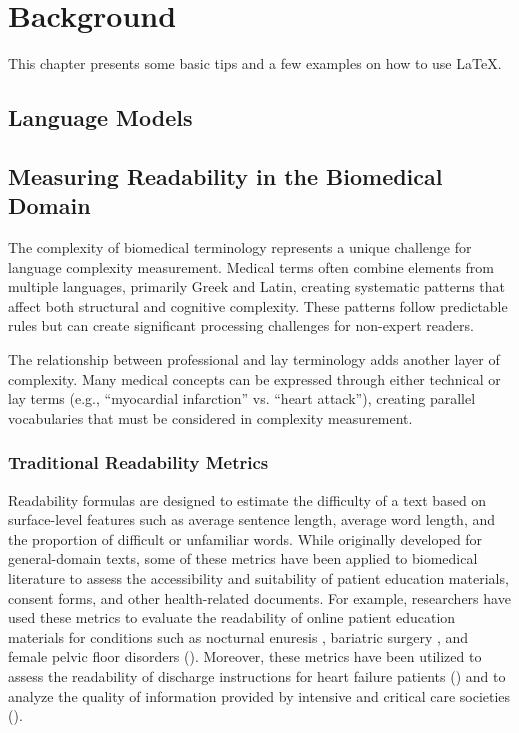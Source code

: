 \chapter{Background}
\label{c2}

This chapter presents some basic tips and a few examples on how to use \LaTeX.


\section{Language Models}
\label{c2:s:language-models}

\section{Measuring Readability in the Biomedical Domain}
\label{c2:s:linguistic-complexity}

The complexity of biomedical terminology represents a unique challenge for language complexity measurement. 
Medical terms often combine elements from multiple languages, primarily Greek and Latin, creating systematic patterns that affect both structural and cognitive complexity. 
These patterns follow predictable rules but can create significant processing challenges for non-expert readers.

The relationship between professional and lay terminology adds another layer of complexity. 
Many medical concepts can be expressed through either technical or lay terms (e.g., ``myocardial infarction'' vs. ``heart attack''), creating parallel vocabularies that must be considered in complexity measurement. 

\subsection{Traditional Readability Metrics}

Readability formulas are designed to estimate the difficulty of a text based on surface-level features such as average sentence length, average word length, and the proportion of difficult or unfamiliar words. While originally developed for general-domain texts, some of these metrics have been applied to biomedical literature to assess the accessibility and suitability of patient education materials, consent forms, and other health-related documents. For example, researchers have used these metrics to evaluate the readability of online patient education materials for conditions such as nocturnal enuresis \cite{Fung2024-uh}, bariatric surgery \cite{Lucy2023-zi}, and female pelvic floor disorders (\cite{Varli2023-ma}). Moreover, these metrics have been utilized to assess the readability of discharge instructions for heart failure patients (\cite{Tuan2023-wc}) and to analyze the quality of information provided by intensive and critical care societies (\cite{Hanci2024-wv}).

